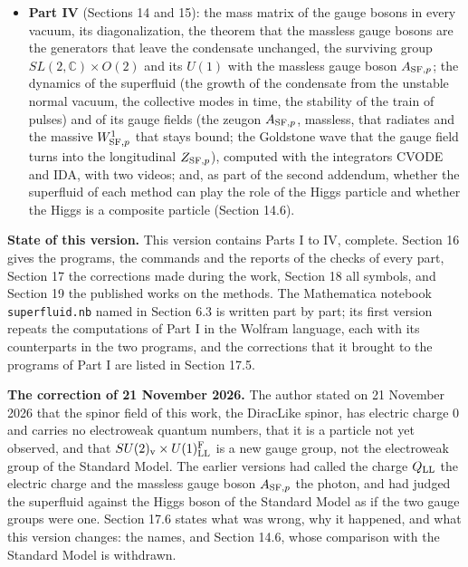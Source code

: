 \documentclass[
  10pt,
]{article}
\begin{document}
\begin{itemize}
  \(\mathrm{SFBSv}^{\rm KS}\); and two addenda of 21 November 2026: the
  free energy at finite temperature, the critical temperatures and the
  size of the order parameter (Section 12.4), and the gradient
  coefficient of the field at the critical temperature with the width of
  the critical region, the Ginzburg number (Section 12.5).
\item
  \textbf{Part IV} (Sections 14 and 15): the mass matrix of the gauge
  bosons in every vacuum, its diagonalization, the theorem that the
  massless gauge bosons are the generators that leave the condensate
  unchanged, the surviving group \(SL(2,\mathbb C)\times O(2)\) and its
  \(U(1)\) with the massless gauge boson \(A_{{\rm SF},p}\); the
  dynamics of the superfluid (the growth of the condensate from the
  unstable normal vacuum, the collective modes in time, the stability of
  the train of pulses) and of its gauge fields (the zeugon
  \(A_{{\rm SF},p}\), massless, that radiates and the massive
  \(W^1_{{\rm SF},p}\) that stays bound; the Goldstone wave that the
  gauge field turns into the longitudinal \(Z_{{\rm SF},p}\)), computed
  with the integrators CVODE and IDA, with two videos; and, as part of
  the second addendum, whether the superfluid of each method can play
  the role of the Higgs particle and whether the Higgs is a composite
  particle (Section 14.6).
\end{itemize}

\textbf{State of this version.} This version contains Parts I to IV,
complete. Section 16 gives the programs, the commands and the reports of
the checks of every part, Section 17 the corrections made during the
work, Section 18 all symbols, and Section 19 the published works on the
methods. The Mathematica notebook \texttt{superfluid.nb} named in
Section 6.3 is written part by part; its first version repeats the
computations of Part I in the Wolfram language, each with its
counterparts in the two programs, and the corrections that it brought to
the programs of Part I are listed in Section 17.5.

\textbf{The correction of 21 November 2026.} The author stated on 21
November 2026 that the spinor field of this work, the DiracLike spinor,
has electric charge 0 and carries no electroweak quantum numbers, that
it is a particle not yet observed, and that
\(SU(2)_{\rm v}\times U(1)^{\rm F}_{\rm LL}\) is a new gauge group, not
the electroweak group of the Standard Model. The earlier versions had
called the charge \(Q_{\rm LL}\) the electric charge and the massless
gauge boson \(A_{{\rm SF},p}\) the photon, and had judged the superfluid
against the Higgs boson of the Standard Model as if the two gauge groups
were one. Section 17.6 states what was wrong, why it happened, and what
this version changes: the names, and Section 14.6, whose comparison with
the Standard Model is withdrawn.
\end{document}
